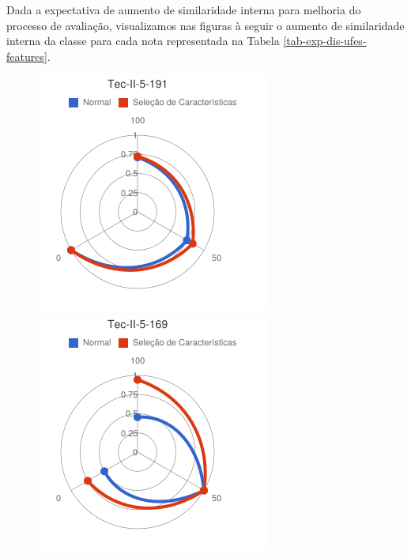 Dada a expectativa de aumento de similaridade interna para melhoria do processo de avaliação, visualizamos nas figuras à seguir o aumento de similaridade interna da classe para cada nota representada na Tabela \ref{tab-exp-dis-ufes-features}.
\begin{figure}
\centering
\begin{minipage}{.3\textwidth}
  \centering
  \includegraphics[width=\linewidth]{img/red-ufes-moodle/image1.png}
\end{minipage}%
\begin{minipage}{.3\textwidth}
  \centering
  \includegraphics[width=\linewidth]{img/red-ufes-moodle/image2.png}

\end{minipage}
\end{figure}
